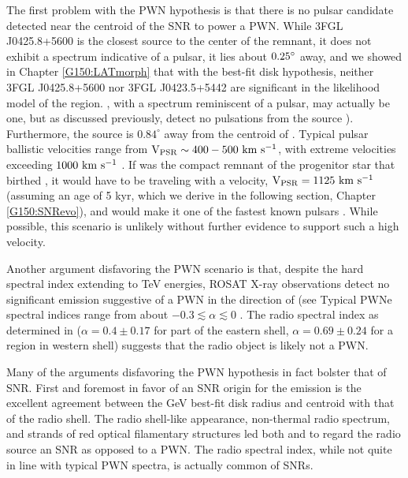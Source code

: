 The first problem with the PWN hypothesis is that there is no pulsar candidate detected near the centroid of the SNR to power a PWN. While 3FGL J0425.8+5600 is the closest \gam{} source to the center of the remnant, it does not exhibit a spectrum indicative of a pulsar, it lies about ${\rm 0.25^\circ }$ away, and we showed in Chapter \ref{G150:LATmorph} that with the best-fit disk hypothesis, neither 3FGL J0425.8+5600 nor 3FGL J0423.5+5442 are significant in the likelihood model of the region. \psrLike{}, with a spectrum reminiscent of a pulsar,  may actually be one, but as discussed previously, \cite{Barr13} detect no pulsations from the source ). Furthermore, the source is $0.84^\circ$ away from the centroid of \Gone{}. Typical pulsar ballistic velocities range from ${\rm V_{PSR} \sim 400-500~km~s^{-1}}$, with extreme velocities exceeding ${\rm 1000~km~s^{-1}}$ \citep{Gaensler06}. If \psrLike{} was the compact remnant of the progenitor star that birthed \Gone{}, it would have to be traveling with a velocity, ${\rm V_{PSR} = 1125~km~s^{-1}}$ (assuming an age of 5 kyr, which we derive in the following section, Chapter \ref{G150:SNRevo}), and would make it one of the fastest known pulsars \citep{Chatterjee05}. While possible, this scenario is unlikely without further evidence to support such a high velocity. 

Another argument disfavoring the PWN scenario is that, despite the hard \gam{} spectral index extending to TeV energies, ROSAT X-ray observations detect no significant emission suggestive of a PWN in the direction of \Gone{} (see %
Typical PWNe spectral indices range from about $-0.3 \lesssim \alpha  \lesssim  0$ \citep{Gaensler06}. The radio spectral index  as determined in \cite{Gao14}  ($\alpha = 0.4 \pm 0.17$ for part of the eastern shell, $\alpha = 0.69 \pm 0.24$ for a region in western shell) suggests that the radio object is likely not a PWN.

Many of the arguments disfavoring the PWN hypothesis in fact bolster that of SNR. First and foremost in favor of an SNR origin for the \gam{} emission is the excellent agreement between the GeV best-fit disk radius and centroid with that of the radio shell.  The radio shell-like appearance, non-thermal radio spectrum, and strands of red optical filamentary structures led both \cite{Gao14} and \cite{Gerbrandt14} to regard the radio source an SNR as opposed to a PWN.  The radio spectral index, while not quite in line with typical PWN spectra, is actually  common of SNRs.

